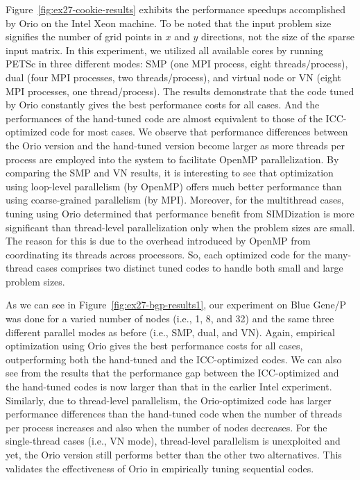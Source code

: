Figure~\ref{fig:ex27-cookie-results} exhibits the performance speedups
accomplished by Orio on the Intel Xeon machine. To be noted that the
input problem size signifies the number of grid points in $x$ and $y$
directions, not the size of the sparse input matrix. In this
experiment, we utilized all available cores by running PETSc in three
different modes: SMP (one MPI process, eight threads/process), dual
(four MPI processes, two threads/process), and virtual node or VN
(eight MPI processes, one thread/process). The results demonstrate
that the code tuned by Orio constantly gives the best performance
costs for all cases. And the performances of the hand-tuned code are
almost equivalent to those of the ICC-optimized code for most
cases. We observe that performance differences between the Orio
version and the hand-tuned version become larger as more threads per
process are employed into the system to facilitate OpenMP
parallelization. By comparing the SMP and VN results, it is
interesting to see that optimization using loop-level parallelism (by
OpenMP) offers much better performance than using coarse-grained
parallelism (by MPI). Moreover, for the multithread cases, tuning
using Orio determined that performance benefit from SIMDization is
more significant than thread-level parallelization only when the
problem sizes are small. The reason for this is due to the overhead
introduced by OpenMP from coordinating its threads across
processors. So, each optimized code for the many-thread cases
comprises two distinct tuned codes to handle both small and large
problem sizes.

As we can see in Figure~\ref{fig:ex27-bgp-results1}, our experiment on
Blue Gene/P was done for a varied number of nodes (i.e., 1, 8, and 32)
and the same three different parallel modes as before (i.e., SMP,
dual, and VN). Again, empirical optimization using Orio gives the best
performance costs for all cases, outperforming both the hand-tuned and
the ICC-optimized codes. We can also see from the results that the
performance gap between the ICC-optimized and the hand-tuned codes is
now larger than that in the earlier Intel experiment. Similarly, due
to thread-level parallelism, the Orio-optimized code has larger
performance differences than the hand-tuned code when the number of
threads per process increases and also when the number of nodes
decreases. For the single-thread cases (i.e., VN mode), thread-level
parallelism is unexploited and yet, the Orio version still performs
better than the other two alternatives. This validates the
effectiveness of Orio in empirically tuning sequential codes.


